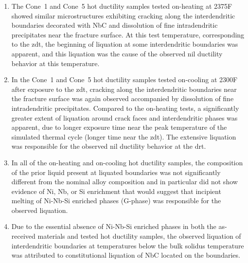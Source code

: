 \begin{enumerate}
\item The Cone~1 and Cone~5 hot ductility samples tested on-heating at 2375\textdegree{}F showed similar microstructures exhibiting cracking along the interdendritic boundaries decorated with NbC and dissolution of fine intradendritic precipitates near the fracture surface. At this test temperature, corresponding to the \gls{zdt}, the beginning of liquation at some interdendritic boundaries was apparent, and this liquation was the cause of the observed nil ductility behavior at this temperature.
\item In the Cone~1 and Cone~5 hot ductility samples tested on-cooling at 2300\textdegree{}F after exposure to the \gls{zdt}, cracking along the interdendritic boundaries near the fracture surface was again observed accompanied by dissolution of fine intradendritic precipitates. Compared to the on-heating tests, a significantly greater extent of liquation around crack faces and interdendritic phases was apparent, due to longer exposure time near the peak temperature of the simulated thermal cycle (longer time near the \gls{zdt}). The extensive liquation was responsible for the observed nil ductility behavior at the \gls{drt}.
\item In all of the on-heating and on-cooling hot ductility samples, the composition of the prior liquid present at liquated boundaries was not significantly different from the nominal alloy composition and in particular did not show evidence of Ni, Nb, or Si enrichment that would suggest that incipient melting of Ni-Nb-Si enriched phases (G-phase) was responsible for the observed liquation.
\item Due to the essential absence of Ni-Nb-Si enriched phases in both the as-received materials and tested hot ductility samples, the observed liquation of interdendritic boundaries at temperatures below the bulk solidus temperature was attributed to constitutional liquation of NbC located on the boundaries.

\end{enumerate}


